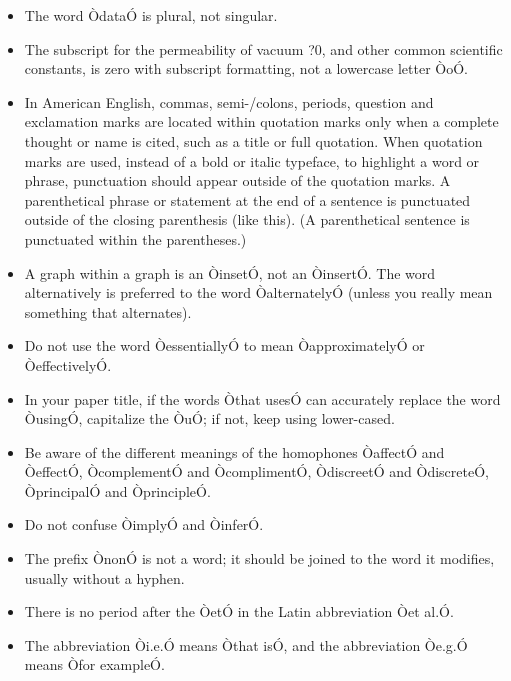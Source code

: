 \documentclass[letterpaper, 10 pt, conference]{ieeeconf}  %
\begin{document}
\begin{itemize}
                                            \item The word ÒdataÓ is plural, not singular.
                                            \item The subscript for the permeability of vacuum ?0, and other common scientific constants, is zero with subscript formatting, not a lowercase letter ÒoÓ.
                                            \item In American English, commas, semi-/colons, periods, question and exclamation marks are located within quotation marks only when a complete thought or name is cited, such as a title or full quotation. When quotation marks are used, instead of a bold or italic typeface, to highlight a word or phrase, punctuation should appear outside of the quotation marks. A parenthetical phrase or statement at the end of a sentence is punctuated outside of the closing parenthesis (like this). (A parenthetical sentence is punctuated within the parentheses.)
                                            \item A graph within a graph is an ÒinsetÓ, not an ÒinsertÓ. The word alternatively is preferred to the word ÒalternatelyÓ (unless you really mean something that alternates).
                                            \item Do not use the word ÒessentiallyÓ to mean ÒapproximatelyÓ or ÒeffectivelyÓ.
                                            \item In your paper title, if the words Òthat usesÓ can accurately replace the word ÒusingÓ, capitalize the ÒuÓ; if not, keep using lower-cased.
                                            \item Be aware of the different meanings of the homophones ÒaffectÓ and ÒeffectÓ, ÒcomplementÓ and ÒcomplimentÓ, ÒdiscreetÓ and ÒdiscreteÓ, ÒprincipalÓ and ÒprincipleÓ.
                                            \item Do not confuse ÒimplyÓ and ÒinferÓ.
                                            \item The prefix ÒnonÓ is not a word; it should be joined to the word it modifies, usually without a hyphen.
                                            \item There is no period after the ÒetÓ in the Latin abbreviation Òet al.Ó.
                                            \item The abbreviation Òi.e.Ó means Òthat isÓ, and the abbreviation Òe.g.Ó means Òfor exampleÓ.

                                        \end{itemize}
\end{document}

